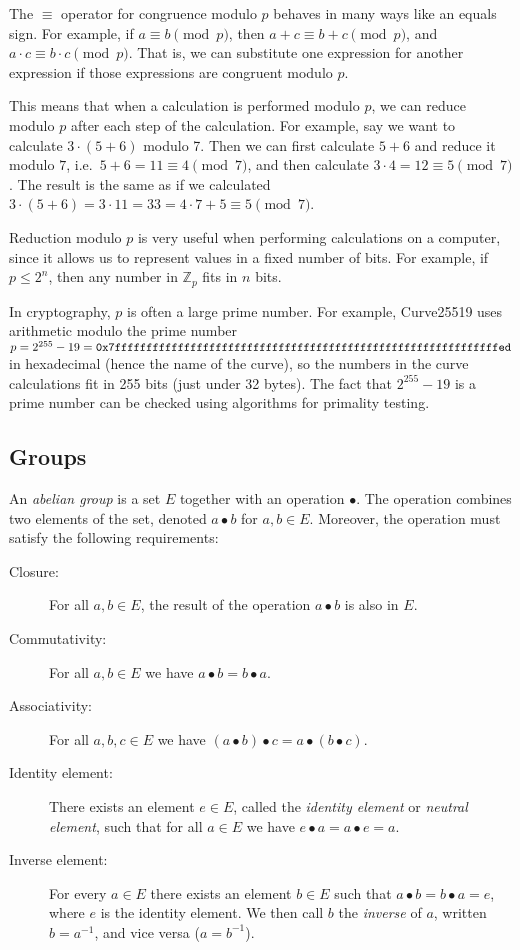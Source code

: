 \documentclass[manuscript]{acmart}
\begin{document}
The $\equiv$ operator for congruence modulo $p$ behaves in many ways like an equals sign.
For example, if $a \equiv b \pmod{p}$, then $a+c \equiv b+c \pmod{p}$, and $a \cdot c \equiv b \cdot c \pmod{p}$.
That is, we can substitute one expression for another expression if those expressions are congruent modulo $p$.

This means that when a calculation is performed modulo $p$, we can reduce modulo $p$ after each step of the calculation.
For example, say we want to calculate $3 \cdot (5 + 6)$ modulo 7.
Then we can first calculate $5+6$ and reduce it modulo $7$, i.e.\ $5+6 = 11 \equiv 4 \pmod{7}$, and then calculate $3 \cdot 4 = 12 \equiv 5 \pmod{7}
$.
The result is the same as if we calculated $3 \cdot (5 + 6) = 3 \cdot 11 = 33 = 4 \cdot 7 + 5 \equiv 5 \pmod{7}$.

Reduction modulo $p$ is very useful when performing calculations on a computer, since it allows us to represent values in a fixed number of bits.
For example, if $p \le 2^n$, then any number in $\mathbb{Z}_p$ fits in $n$ bits.

In cryptography, $p$ is often a large prime number.
For example, Curve25519 uses arithmetic modulo the prime number $p=2^{255}-19=\verb|0x7fffffffffffffffffffffffffffffffffffffffffffffffffffffffffffffed|$ in hexadecimal (hence the name of the curve), so the numbers in the curve calculations fit in 255 bits (just under 32 bytes).
The fact that $2^{255}-19$ is a prime number can be checked using algorithms for primality testing.

\subsection{Groups}\label{sec:groups}

An \emph{abelian group} is a set $E$ together with an operation $\bullet$.
The operation combines two elements of the set, denoted $a \bullet b$ for $a, b \in E$.
Moreover, the operation must satisfy the following requirements:
\begin{description}
\item[Closure:] For all $a, b \in E$, the result of the operation $a \bullet b$ is also in $E$.
\item[Commutativity:] For all $a, b \in E$ we have $a \bullet b = b \bullet a$.
\item[Associativity:] For all $a, b, c \in E$ we have $(a \bullet b) \bullet c = a \bullet (b \bullet c)$.
\item[Identity element:] There exists an element $e \in E$, called the \emph{identity element} or \emph{neutral element}, such that for all $a \in E$ we have $e \bullet a = a \bullet e = a$.
\item[Inverse element:] For every $a \in E$ there exists an element $b \in E$ such that $a \bullet b = b \bullet a = e$, where $e$ is the identity element. We then call $b$ the \emph{inverse} of $a$, written $b = a^{-1}$, and vice versa ($a = b^{-1}$).
\end{description}
\end{document}
